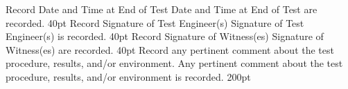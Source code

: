 %
\tpStep%
{Record Date and Time at End of Test}
{Date and Time at End of Test are recorded.}
{40pt}
%
\tpStep%
{Record Signature of Test Engineer(s)}
{Signature of Test Engineer(s) is recorded.}
{40pt}
%
\tpStep%
{Record Signature of Witness(es)}
{Signature of Witness(es) are recorded.}
{40pt}
%
\tpStep%
{Record any pertinent comment about the test procedure, results, and/or environment.}
{Any pertinent comment about the test procedure, results, and/or environment is recorded.}
{200pt}
%
